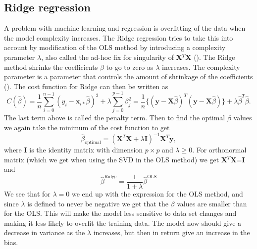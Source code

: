 \documentclass[12pt,a4paper,english]{article}
\begin{document}
\subsection{Ridge regression}
A problem with machine learning  and regression is overfitting of the data when the model complexity increases. The Ridge regression tries to take this into account by modification of the OLS method by introducing a complexity parameter $\lambda$, also called the ad-hoc fix for singularity of \textbf{X}$^T$\textbf{X} (\citet{wieringen2015}). The Ridge method shrinks the coefficients $\beta$ to go to zero as $\lambda$ increases. The complexity parameter is a parameter that controls the amount of shrinkage of the coefficients (\citet{hastie2009}). The cost function for Ridge can then be written as
\begin{equation}
\label{eq:cost_ridge}
C(\hat{\beta})=\frac{1}{n}\sum_{i=0}^{n-1}(y_i-\textbf{x}_{i*}\hat{\beta})^2+\lambda\sum_{j=0}^{p-1}\beta_j^2=\frac{1}{n}\{(\textbf{y}-\textbf{X}\hat{\beta})^T(\textbf{y}-\textbf{X}\hat{\beta})\}+\lambda\hat{\beta}^T\hat{\beta}.
\end{equation}
The last term above is called the penalty term.
Then to find the optimal $\beta$ values we again take the minimum of the cost function to get
\begin{equation}
\label{eq:beta_opt_ridge}
\hat{\beta}_{\text{optimal}}=(\textbf{X}^T\textbf{X}+\lambda \textbf{I})^{-1}\textbf{X}^T\textbf{y},
\end{equation}
where \textbf{I} is the identity matrix with dimension $p\times p$ and $\lambda\geq0$. For orthonormal matrix (which we get when using the SVD in the OLS method) we get \textbf{X}$^T$\textbf{X}=\textbf{I} and
\begin{equation*}
\hat{\beta}^{\text{Ridge}}=\frac{1}{1+\lambda}\hat{\beta}^{\text{OLS}}
\end{equation*}
We see that for $\lambda=0$ we end up with the expression for the OLS method, and since $\lambda$ is defined to never be negative we get that the $\beta$ values are smaller than for the OLS. This will make the model less sensitive to data set changes and making it less likely to overfit the training data. The model now should give a decrease in variance as the $\lambda$ increases, but then in return give an increase in the bias.
\end{document}
